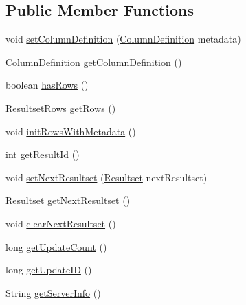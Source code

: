\subsection*{Public Member Functions}
\begin{DoxyCompactItemize}
\item 
void \mbox{\hyperlink{interfacecom_1_1mysql_1_1cj_1_1protocol_1_1_resultset_aee8797446404a63565e56825f2b5a5d4}{set\+Column\+Definition}} (\mbox{\hyperlink{interfacecom_1_1mysql_1_1cj_1_1protocol_1_1_column_definition}{Column\+Definition}} metadata)
\item 
\mbox{\hyperlink{interfacecom_1_1mysql_1_1cj_1_1protocol_1_1_column_definition}{Column\+Definition}} \mbox{\hyperlink{interfacecom_1_1mysql_1_1cj_1_1protocol_1_1_resultset_aa09b585b364b09f418b47bd267b1758b}{get\+Column\+Definition}} ()
\item 
boolean \mbox{\hyperlink{interfacecom_1_1mysql_1_1cj_1_1protocol_1_1_resultset_acafe4b216e2086884d0758c64fd34c0b}{has\+Rows}} ()
\item 
\mbox{\hyperlink{interfacecom_1_1mysql_1_1cj_1_1protocol_1_1_resultset_rows}{Resultset\+Rows}} \mbox{\hyperlink{interfacecom_1_1mysql_1_1cj_1_1protocol_1_1_resultset_a56ff0f26904a612a034bf839cae46d51}{get\+Rows}} ()
\item 
void \mbox{\hyperlink{interfacecom_1_1mysql_1_1cj_1_1protocol_1_1_resultset_a2ee6b6a8cb5164dfc293b23cefb96b46}{init\+Rows\+With\+Metadata}} ()
\item 
int \mbox{\hyperlink{interfacecom_1_1mysql_1_1cj_1_1protocol_1_1_resultset_a77886132904378ea915db2b4803e588c}{get\+Result\+Id}} ()
\item 
void \mbox{\hyperlink{interfacecom_1_1mysql_1_1cj_1_1protocol_1_1_resultset_a030e08e421f62239d808fc1be2808ac4}{set\+Next\+Resultset}} (\mbox{\hyperlink{interfacecom_1_1mysql_1_1cj_1_1protocol_1_1_resultset}{Resultset}} next\+Resultset)
\item 
\mbox{\hyperlink{interfacecom_1_1mysql_1_1cj_1_1protocol_1_1_resultset}{Resultset}} \mbox{\hyperlink{interfacecom_1_1mysql_1_1cj_1_1protocol_1_1_resultset_aeb71f17cb0bbc2c33b47bc7e6a1f750c}{get\+Next\+Resultset}} ()
\item 
void \mbox{\hyperlink{interfacecom_1_1mysql_1_1cj_1_1protocol_1_1_resultset_ab66d8aa07fe7c7860c0852a7a10f4e27}{clear\+Next\+Resultset}} ()
\item 
long \mbox{\hyperlink{interfacecom_1_1mysql_1_1cj_1_1protocol_1_1_resultset_a72a3e90cf2affd2bbc8826a2c2e39df9}{get\+Update\+Count}} ()
\item 
long \mbox{\hyperlink{interfacecom_1_1mysql_1_1cj_1_1protocol_1_1_resultset_ab9b9750b3d8a9d8cc35af6d1e59dd86f}{get\+Update\+ID}} ()
\item 
String \mbox{\hyperlink{interfacecom_1_1mysql_1_1cj_1_1protocol_1_1_resultset_a41ec899fbc6875d7b31245be7245ae9a}{get\+Server\+Info}} ()
\end{DoxyCompactItemize}


